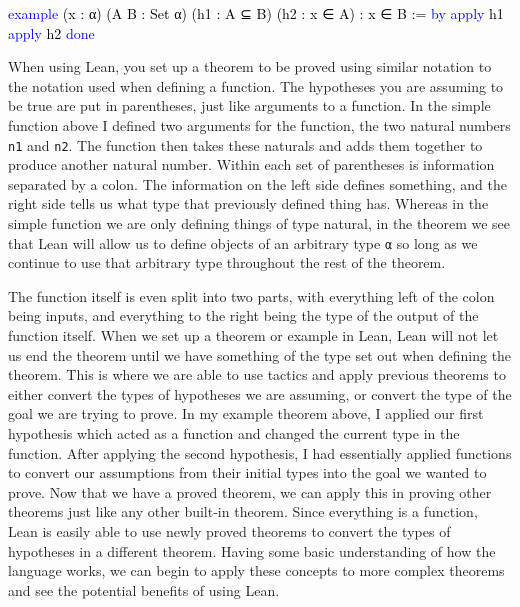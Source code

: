 \documentclass[
  letterpaper,
]{scrreprt}
\newenvironment{Shaded}{\begin{snugshade}}{\end{snugshade}}
\newcommand{\KeywordTok}[1]{\textcolor[rgb]{0.00,0.23,0.31}{#1}}
\newcommand{\NormalTok}[1]{\textcolor[rgb]{0.00,0.23,0.31}{#1}}
\renewcommand{\NormalTok}[1]{\textcolor[HTML]{000000}{#1}}
\renewcommand{\KeywordTok}[1]{\textcolor[HTML]{0000FF}{#1}}
\theoremstyle{remark}
\begin{document}
\begin{Shaded}
\begin{Highlighting}[]
\KeywordTok{example}\NormalTok{ (x : α) (A B : Set α) (h1 : A ⊆ B) }
\NormalTok{    (h2 : x ∈ A) : x ∈ B := }\KeywordTok{by}
  \KeywordTok{apply}\NormalTok{ h1}
  \KeywordTok{apply}\NormalTok{ h2}
  \KeywordTok{done}
\end{Highlighting}
\end{Shaded}

When using Lean, you set up a theorem to be proved using similar
notation to the notation used when defining a function. The hypotheses
you are assuming to be true are put in parentheses, just like arguments
to a function. In the simple function above I defined two arguments for
the function, the two natural numbers \texttt{n1} and \texttt{n2}. The
function then takes these naturals and adds them together to produce
another natural number. Within each set of parentheses is information
separated by a colon. The information on the left side defines
something, and the right side tells us what type that previously defined
thing has. Whereas in the simple function we are only defining things of
type natural, in the theorem we see that Lean will allow us to define
objects of an arbitrary type \texttt{α} so long as we continue to use
that arbitrary type throughout the rest of the theorem.

The function itself is even split into two parts, with everything left
of the colon being inputs, and everything to the right being the type of
the output of the function itself. When we set up a theorem or example
in Lean, Lean will not let us end the theorem until we have something of
the type set out when defining the theorem. This is where we are able to
use tactics and apply previous theorems to either convert the types of
hypotheses we are assuming, or convert the type of the goal we are
trying to prove. In my example theorem above, I applied our first
hypothesis which acted as a function and changed the current type in the
function. After applying the second hypothesis, I had essentially
applied functions to convert our assumptions from their initial types
into the goal we wanted to prove. Now that we have a proved theorem, we
can apply this in proving other theorems just like any other built-in
theorem. Since everything is a function, Lean is easily able to use
newly proved theorems to convert the types of hypotheses in a different
theorem. Having some basic understanding of how the language works, we
can begin to apply these concepts to more complex theorems and see the
potential benefits of using Lean.
\end{document}
